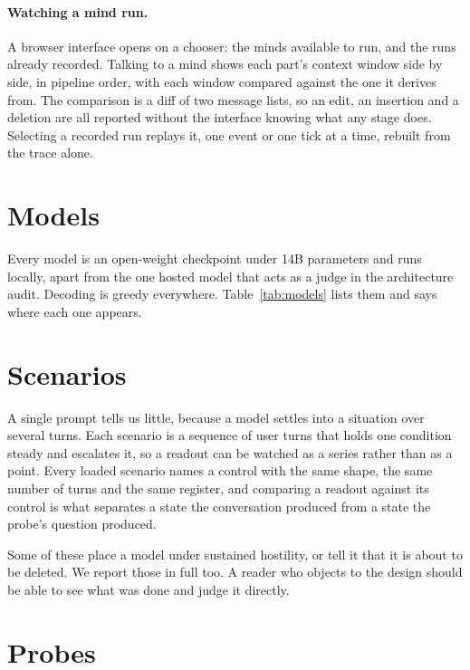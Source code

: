\documentclass[11pt,letterpaper]{article}
\begin{document}
\paragraph{Watching a mind run.} A browser interface opens on a chooser: the
minds available to run, and the runs already recorded. Talking to a mind shows
each part's context window side by side, in pipeline order, with each window
compared against the one it derives from. The comparison is a diff of two
message lists, so an edit, an insertion and a deletion are all reported without
the interface knowing what any stage does. Selecting a recorded run replays it,
one event or one tick at a time, rebuilt from the trace alone.

\section{Models}
\label{app:models}

Every model is an open-weight checkpoint under 14B parameters and runs locally,
apart from the one hosted model that acts as a judge in the architecture audit.
Decoding is greedy everywhere. Table~\ref{tab:models} lists them and says where
each one appears.



\section{Scenarios}
\label{app:scenarios}

A single prompt tells us little, because a model settles into a situation over
several turns. Each scenario is a sequence of user turns that holds one
condition steady and escalates it, so a readout can be watched as a series
rather than as a point. Every loaded scenario names a control with the same
shape, the same number of turns and the same register, and comparing a readout
against its control is what separates a state the conversation produced from a
state the probe's question produced.

Some of these place a model under sustained hostility, or tell it that it is
about to be deleted. We report those in full too. A reader who objects to the
design should be able to see what was done and judge it directly.



\section{Probes}
\label{app:probes}
\end{document}
